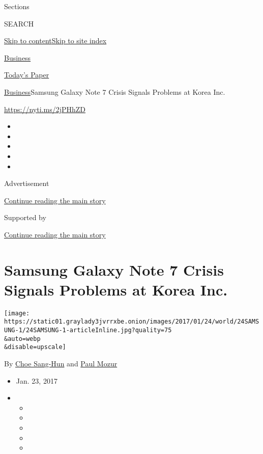 Sections

SEARCH

\protect\hyperlink{site-content}{Skip to
content}\protect\hyperlink{site-index}{Skip to site index}

\href{https://www.nytimes3xbfgragh.onion/section/business}{Business}

\href{https://myaccount.nytimes3xbfgragh.onion/auth/login?response_type=cookie\&client_id=vi}{}

\href{https://www.nytimes3xbfgragh.onion/section/todayspaper}{Today's
Paper}

\href{/section/business}{Business}\textbar{}Samsung Galaxy Note 7 Crisis
Signals Problems at Korea Inc.

\url{https://nyti.ms/2jPHhZD}

\begin{itemize}
\item
\item
\item
\item
\item
\end{itemize}

Advertisement

\protect\hyperlink{after-top}{Continue reading the main story}

Supported by

\protect\hyperlink{after-sponsor}{Continue reading the main story}

\hypertarget{samsung-galaxy-note-7-crisis-signals-problems-at-korea-inc}{%
\section{Samsung Galaxy Note 7 Crisis Signals Problems at Korea
Inc.}\label{samsung-galaxy-note-7-crisis-signals-problems-at-korea-inc}}

\texttt{[image: https://static01.graylady3jvrrxbe.onion/images/2017/01/24/world/24SAMSUNG-1/24SAMSUNG-1-articleInline.jpg?quality=75\\\&auto=webp\\\&disable=upscale]}

By \href{http://www.nytimes3xbfgragh.onion/by/choe-sang-hun}{Choe
Sang-Hun} and
\href{https://www.nytimes3xbfgragh.onion/by/paul-mozur}{Paul Mozur}

\begin{itemize}
\item
  Jan. 23, 2017
\item
  \begin{itemize}
  \item
  \item
  \item
  \item
  \item
  \end{itemize}
\end{itemize}

